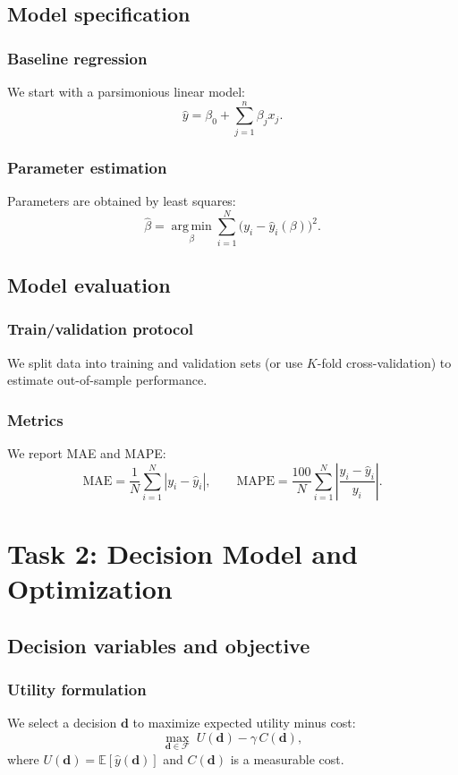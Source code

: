 \documentclass[12pt]{article}
\newcommand{\E}{\mathbb{E}}
\newcommand{\vect}[1]{\boldsymbol{#1}}
\newcommand{\argmin}{\operatorname*{arg\,min}}
\begin{document}
\subsection{Model specification}
\subsubsection{Baseline regression}
We start with a parsimonious linear model:
\begin{equation}
\hat{y}=\beta_0+\sum_{j=1}^{n}\beta_j x_j.
\label{eq:lin}
\end{equation}

\subsubsection{Parameter estimation}
Parameters are obtained by least squares:
\begin{equation}
\hat{\beta}=\argmin_{\beta}\sum_{i=1}^{N}\big(y_i-\hat{y}_i(\beta)\big)^2.
\label{eq:ls}
\end{equation}

\subsection{Model evaluation}
\subsubsection{Train/validation protocol}
We split data into training and validation sets (or use $K$-fold cross-validation) to estimate out-of-sample performance.

\subsubsection{Metrics}
We report MAE and MAPE:
\[
\mathrm{MAE}=\frac{1}{N}\sum_{i=1}^{N}|y_i-\hat{y}_i|,
\qquad
\mathrm{MAPE}=\frac{100}{N}\sum_{i=1}^{N}\left|\frac{y_i-\hat{y}_i}{y_i}\right|.
\]

\section{Task 2: Decision Model and Optimization}
\subsection{Decision variables and objective}
\subsubsection{Utility formulation}
We select a decision $\vect{d}$ to maximize expected utility minus cost:
\begin{equation}
\max_{\vect{d}\in\mathcal{F}}\; U(\vect{d})-\gamma\,C(\vect{d}),
\label{eq:utility}
\end{equation}
where $U(\vect{d})=\E[\hat{y}(\vect{d})]$ and $C(\vect{d})$ is a measurable cost.
\end{document}
